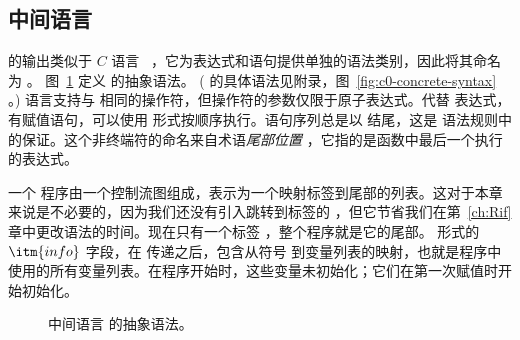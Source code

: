 \documentclass[11pt]{book}
\begin{document}


\subsection{ \LangCVar{} 中间语言}

  的输出类似于 $C$
语言~\citep{Kernighan:1988nx} ，它为表达式和语句提供单独的语法类别，因此将其命名为 \LangCVar{} 。 图~\ref{fig:c0-syntax} 定义 \LangCVar{} 的抽象语法。
( \LangCVar{} 的具体语法见附录，图~\ref{fig:c0-concrete-syntax} 。)
%
\LangCVar{} 语言支持与 \LangVar{} 相同的操作符，但操作符的参数仅限于原子表达式。代替  表达式， \LangCVar{} 有赋值语句，可以使用 形式按顺序执行。语句序列总是以  结尾，这是
 语法规则中的保证。这个非终端符的命名来自术语\emph{尾部位置} ，它指的是函数中最后一个执行的表达式。

一个 \LangCVar{} 程序由一个控制流图组成，表示为一个映射标签到尾部的列表。这对于本章来说是不必要的，因为我们还没有引入跳转到标签的  ，但它节省我们在第~\ref{ch:Rif} 章中更改语法的时间。现在只有一个标签
 ，整个程序就是它的尾部。
%
 形式的 $\itm{info}$ 字段，在 传递之后，包含从符号
 到变量列表的映射，也就是程序中使用的所有变量列表。在程序开始时，这些变量未初始化；它们在第一次赋值时开始初始化。

\begin{figure}[tbp]
\caption{中间语言 \LangCVar{} 的抽象语法。}
\label{fig:c0-syntax}
\end{figure}
\end{document}
